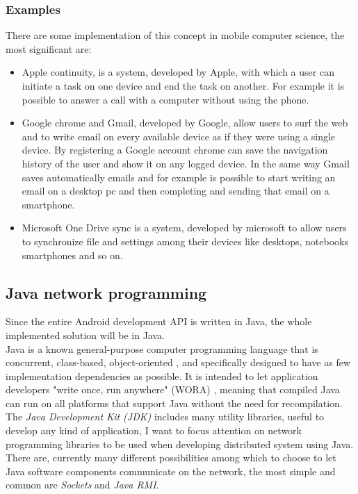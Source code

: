 \subsubsection{Examples}
There are some implementation of this concept in mobile computer science, the most significant are:
\begin{itemize}
	\item Apple continuity, is a system, developed by Apple, with which a user can initiate a task on one device and end the task on another. For example it is possible to answer a call with a computer without using the phone.
	\item Google chrome and Gmail, developed by Google, allow users to surf the web and to write email on every available device as if they were using a single device. By registering a Google account chrome can save the navigation history of the user and show it on any logged device. In the same way Gmail saves automatically emails and for example is possible to start writing an email on a desktop pc and then completing and sending that email on a smartphone.
	\item Microsoft One Drive sync is a system, developed by microsoft to allow users to synchronize file and settings among their devices like desktops, notebooks smartphones and so on.
\end{itemize}

\subsection{Java network programming}
Since the entire Android development API is written in Java, the whole implemented solution will be in Java.\\ Java is a known general-purpose computer programming language that is concurrent, class-based, object-oriented \cite{gosling2005the}, and specifically designed to have as few implementation dependencies as possible. It is intended to let application developers "write once, run anywhere" (WORA) \cite{computer2002write}, meaning that compiled Java can run on all platforms that support Java without the need for recompilation.\\
The \textit{Java Development Kit (JDK)} includes many utility libraries, useful to develop any kind of application, I want to focus attention on network programming libraries to be used when developing distributed system using Java.
There are, currently many different possibilities among which to choose to let Java software components communicate on the network, the most simple and common are \textit{Sockets} and \textit{Java RMI}.
